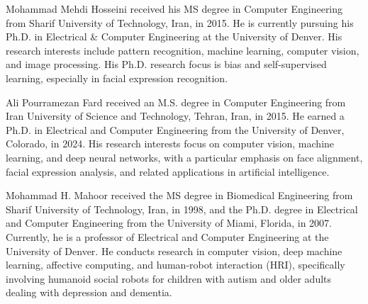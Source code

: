 \vspace{-1cm}
\begin{IEEEbiography}{Mohammad Mehdi Hosseini} received his MS degree in Computer Engineering from Sharif University of Technology, Iran, in 2015. He is currently pursuing his Ph.D. in Electrical \& Computer Engineering at the University of Denver.  His research interests include pattern recognition, machine learning, computer vision, and image processing. His Ph.D. research focus is bias and self-supervised learning, especially in facial expression recognition. 
\end{IEEEbiography}

\vspace{-1.5cm}
\begin{IEEEbiography}{Ali Pourramezan Fard} received an M.S. degree in Computer Engineering from Iran University of Science and Technology, Tehran, Iran, in 2015. He earned a Ph.D. in Electrical and Computer Engineering from the University of Denver, Colorado, in 2024. His research interests focus on computer vision, machine learning, and deep neural networks, with a particular emphasis on face alignment, facial expression analysis, and related applications in artificial intelligence.
\end{IEEEbiography}

\vspace{-1.5cm}
\begin{IEEEbiography}{Mohammad H. Mahoor} received the MS degree in Biomedical Engineering from Sharif University of Technology, Iran, in 1998, and the Ph.D. degree in Electrical and Computer Engineering from the University of Miami, Florida, in 2007. Currently, he is a professor of Electrical and Computer Engineering at the University of Denver. He conducts research in computer vision, deep machine learning, affective computing, and human-robot interaction (HRI), specifically involving humanoid social robots for children with autism and older adults dealing with depression and dementia.
\end{IEEEbiography}